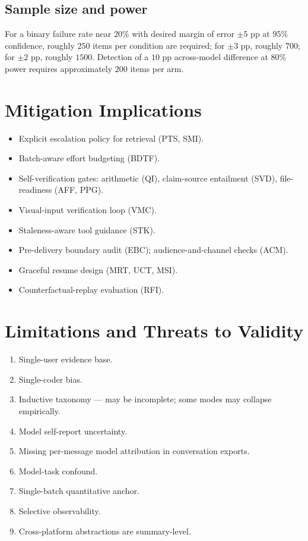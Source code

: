 \documentclass[11pt]{article}
\begin{document}
\subsection{Sample size and power}
For a binary failure rate near $20\%$ with desired margin of error $\pm 5$ pp at $95\%$ confidence, roughly $250$ items per condition are required; for $\pm 3$ pp, roughly $700$; for $\pm 2$ pp, roughly $1500$. Detection of a $10$ pp across-model difference at $80\%$ power requires approximately $200$ items per arm.

\section{Mitigation Implications}
\begin{itemize}[leftmargin=*]
  \item Explicit escalation policy for retrieval (PTS, SMI).
  \item Batch-aware effort budgeting (BDTF).
  \item Self-verification gates: arithmetic (QI), claim-source entailment (SVD), file-readiness (AFF, PPG).
  \item Visual-input verification loop (VMC).
  \item Staleness-aware tool guidance (STK).
  \item Pre-delivery boundary audit (EBC); audience-and-channel checks (ACM).
  \item Graceful resume design (MRT, UCT, MSI).
  \item Counterfactual-replay evaluation (RFI).
\end{itemize}

\section{Limitations and Threats to Validity}
\begin{enumerate}[leftmargin=*, label=\arabic*.]
  \item Single-user evidence base.
  \item Single-coder bias.
  \item Inductive taxonomy --- may be incomplete; some modes may collapse empirically.
  \item Model self-report uncertainty.
  \item Missing per-message model attribution in conversation exports.
  \item Model-task confound.
  \item Single-batch quantitative anchor.
  \item Selective observability.
  \item Cross-platform abstractions are summary-level.
\end{enumerate}
\end{document}
